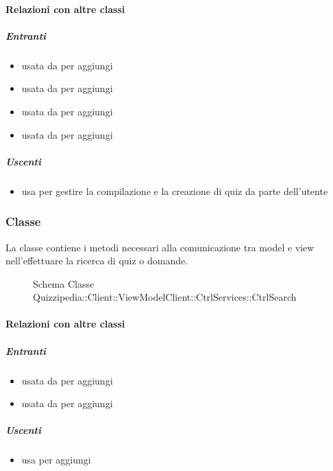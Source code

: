 \paragraph{Relazioni con altre classi}
\subparagraph{Entranti}
\begin{itemize}
\item usata da  per aggiungi
\item usata da  per aggiungi
\item usata da  per aggiungi
\item usata da  per aggiungi
\end{itemize}
\subparagraph{Uscenti}
\begin{itemize}
\item usa  per gestire la compilazione e la creazione di quiz da parte dell'utente
\end{itemize}
\subsubsection{Classe }
La classe contiene i metodi necessari alla comunicazione tra model e view nell'effettuare la ricerca di quiz o domande.
\begin{figure}[H]
\centering
\noindent{}
\caption[Schema Classe CtrlSearch]{Schema Classe Quizzipedia::Client::ViewModelClient::CtrlServices::CtrlSearch}
\end{figure}
\paragraph{Relazioni con altre classi}
\subparagraph{Entranti}
\begin{itemize}
\item usata da  per aggiungi
\item usata da  per aggiungi
\end{itemize}
\subparagraph{Uscenti}
\begin{itemize}
\item usa  per aggiungi
\end{itemize}
